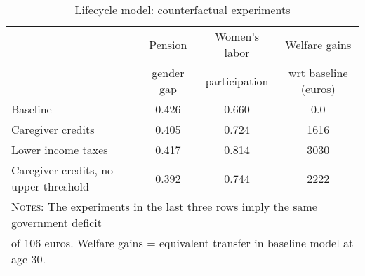 \begin{table}[htbp]\caption{Lifecycle model: counterfactual experiments}\label{table:experiments}\centering\footnotesize\begin{tabular}{lccc} \toprule & Pension & Women's labor & Welfare gains  \\&gender gap &participation & wrt baseline (euros)  \\\midrule    Baseline                                &0.426&0.660& 0.0\\ Caregiver credits                       &0.405&0.724& 1616\\ Lower income taxes                      &0.417&0.814& 3030\\ Caregiver credits, no upper threshold   &0.392&0.744& 2222\\  \bottomrule\multicolumn{4}{l}{\textsc{Notes:} The experiments in the last three rows imply the same government deficit}\\\multicolumn{4}{l}{of   106 euros. Welfare gains = equivalent transfer in baseline model at age 30. }\end{tabular}
      \end{table}